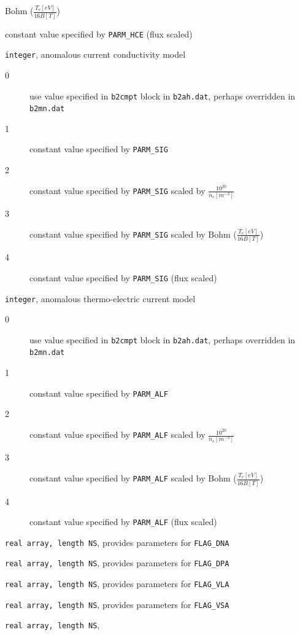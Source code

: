 \documentclass[a4paper,10pt]{report}
\begin{document}
\begin{description}
\begin{description}
  Bohm ($\frac{T_e [eV]}{16 B [T]}$)
  \item[4] constant value specified by {\tt PARM\_HCE} (flux scaled)
  \end{description}
\item[FLAG\_SIG] {\tt integer}, anomalous current conductivity model
  \begin{description}
  \item[0] use value specified in {\tt b2cmpt} block in
  {\tt b2ah.dat}, perhaps overridden in {\tt b2mn.dat}
  \item[1] constant value specified by {\tt PARM\_SIG}
  \item[2] constant value specified by {\tt PARM\_SIG} scaled by
  $\frac{10^{20}}{n_e [m^{-3}]}$
  \item[3] constant value specified by {\tt PARM\_SIG} scaled by
  Bohm ($\frac{T_e [eV]}{16 B [T]}$)
  \item[4] constant value specified by {\tt PARM\_SIG} (flux scaled)
  \end{description}
\item[FLAG\_ALF] {\tt integer}, anomalous thermo-electric current model
  \begin{description}
  \item[0] use value specified in {\tt b2cmpt} block in
  {\tt b2ah.dat}, perhaps overridden in {\tt b2mn.dat}
  \item[1] constant value specified by {\tt PARM\_ALF}
  \item[2] constant value specified by {\tt PARM\_ALF} scaled by
  $\frac{10^{20}}{n_e [m^{-3}]}$
  \item[3] constant value specified by {\tt PARM\_ALF} scaled by
  Bohm ($\frac{T_e [eV]}{16 B [T]}$)
  \item[4] constant value specified by {\tt PARM\_ALF} (flux scaled)
  \end{description}
\item[PARM\_DNA] {\tt real array, length NS},
  provides parameters for {\tt FLAG\_DNA}
\item[PARM\_DPA] {\tt real array, length NS},
  provides parameters for {\tt FLAG\_DPA}
\item[PARM\_VLA] {\tt real array, length NS},
  provides parameters for {\tt FLAG\_VLA}
\item[PARM\_VSA] {\tt real array, length NS},
  provides parameters for {\tt FLAG\_VSA}
\item[PARM\_HCI] {\tt real array, length NS},

\end{description}
\end{document}
